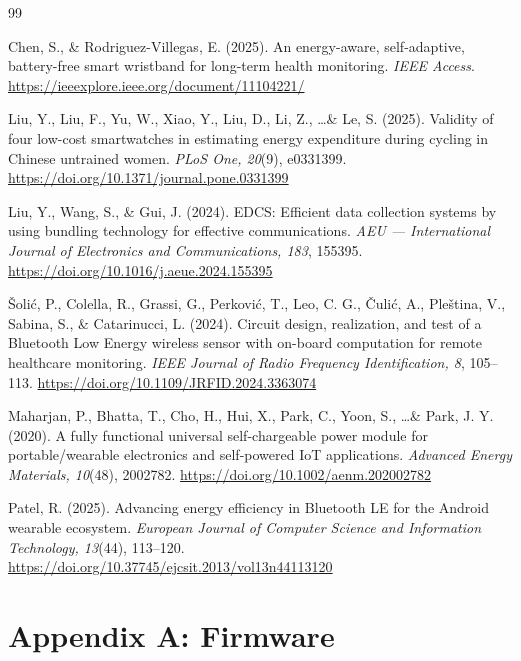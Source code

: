 \documentclass[12pt, a4paper]{article}
\begin{document}
\newpage
\begin{thebibliography}{99}

 Chen, S., \& Rodriguez-Villegas, E. (2025). An energy-aware,
self-adaptive, battery-free smart wristband for long-term health monitoring.
\emph{IEEE Access}.
\url{https://ieeexplore.ieee.org/document/11104221/}

 Liu, Y., Liu, F., Yu, W., Xiao, Y., Liu, D., Li, Z., \ldots \&
Le, S. (2025). Validity of four low-cost smartwatches in estimating energy
expenditure during cycling in Chinese untrained women. \emph{PLoS One, 20}(9),
e0331399. \url{https://doi.org/10.1371/journal.pone.0331399}

 Liu, Y., Wang, S., \& Gui, J. (2024). EDCS: Efficient data
collection systems by using bundling technology for effective communications.
\emph{AEU --- International Journal of Electronics and Communications, 183},
155395. \url{https://doi.org/10.1016/j.aeue.2024.155395}

 \v{S}oli\'{c}, P., Colella, R., Grassi, G., Perkovi\'{c}, T.,
Leo, C. G., \v{C}uli\'{c}, A., Ple\v{s}tina, V., Sabina, S., \& Catarinucci, L.
(2024). Circuit design, realization, and test of a Bluetooth Low Energy wireless
sensor with on-board computation for remote healthcare monitoring. \emph{IEEE
Journal of Radio Frequency Identification, 8}, 105--113.
\url{https://doi.org/10.1109/JRFID.2024.3363074}

 Maharjan, P., Bhatta, T., Cho, H., Hui, X., Park, C.,
Yoon, S., \ldots \& Park, J. Y. (2020). A fully functional universal
self-chargeable power module for portable/wearable electronics and self-powered
IoT applications. \emph{Advanced Energy Materials, 10}(48), 2002782.
\url{https://doi.org/10.1002/aenm.202002782}

 Patel, R. (2025). Advancing energy efficiency in Bluetooth LE
for the Android wearable ecosystem. \emph{European Journal of Computer Science
and Information Technology, 13}(44), 113--120.
\url{https://doi.org/10.37745/ejcsit.2013/vol13n44113120}

\end{thebibliography}

\newpage
\appendix
\section{Appendix A: Firmware}
\label{app:code}
\end{document}
